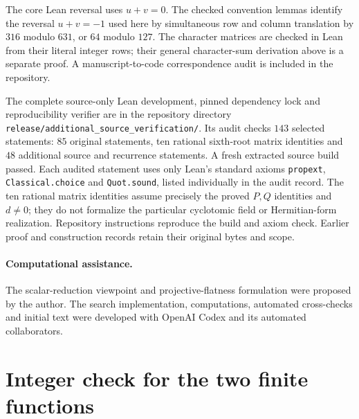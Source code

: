 \documentclass[10pt]{article}
\begin{document}
The core Lean reversal uses $u+v=0$. The checked convention lemmas
identify the reversal $u+v=-1$ used here by simultaneous row and column
translation by $316$ modulo $631$, or $64$ modulo $127$.
The character matrices are checked in Lean from their literal integer
rows; their general character-sum derivation above is a separate proof.
A manuscript-to-code correspondence audit is included in the repository.

The complete source-only Lean development, pinned dependency lock and
reproducibility verifier are in the repository directory
\texttt{release/additional\_source\_verification/}.
Its audit checks $143$ selected statements: $85$ original statements,
ten rational sixth-root matrix identities and $48$ additional source and
recurrence statements. A fresh extracted source build passed. Each audited
statement uses only Lean's standard axioms \texttt{propext},
\texttt{Classical.choice} and \texttt{Quot.sound}, listed individually
in the audit record. The ten rational matrix identities assume precisely
the proved $P,Q$ identities and $d\ne0$; they do not formalize the particular
cyclotomic field or Hermitian-form realization. Repository instructions
reproduce the build and axiom check. Earlier proof and construction records
retain their original bytes and scope.

\paragraph{Computational assistance.}
The scalar-reduction viewpoint and projective-flatness formulation were
proposed by the author. The search implementation, computations, automated
cross-checks and initial text were developed with OpenAI Codex and its
automated collaborators.


\appendix
\section{Integer check for the two finite functions}\label{app:integer}
\end{document}
